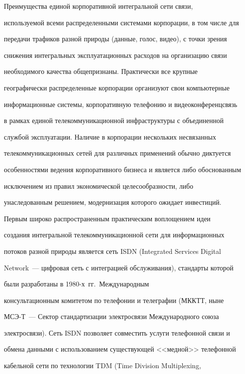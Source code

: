       


      Преимущества единой корпоративной интегральной сети связи, 


исполь\-зу\-емой всеми распределенными системами корпорации, в том числе для 


передачи трафиков разной природы (данные, голос, видео), с точки зрения 


снижения интегральных эксплуатационных расходов на организацию связи 


необходимого качества общепризнаны. Практически все крупные 


географически распределенные корпорации организуют свои компьютерные 


информационные системы, корпоративную телефонию и видеоконференцсвязь 


в рамках единой телекоммуникационной инфраструктуры с объединенной 


службой эксплуатации. Наличие в корпорации нескольких несвязанных 


телекоммуникационных сетей для различных применений обычно диктуется 


особенностями ведения корпоративного бизнеса и является либо обоснованным 


исключением из правил экономической целесообразности, либо 


унаследованным решением, модернизация которого ожидает инвестиций.


      


      Первым широко распространенным практическим воплощением идеи 


создания интегральной телекоммуникационной сети для информационных 


потоков разной природы является сеть ISDN (Integrated Services Digital 


Network~--- цифровая сеть с интеграцией обслуживания), стандарты которой 


были разработаны в 1980-х~гг.\ Международным 


консультационным комитетом по телефонии и телеграфии (МККТТ, ныне 


МСЭ-Т~--- Сектор стандартизации электросвязи Международного союза 


электросвязи). Сеть ISDN позволяет совместить услуги телефонной связи и 


обмена данными с использованием существующей <<медной>> телефонной 


кабельной сети по технологии TDM (Time Division Multiplexing, 


